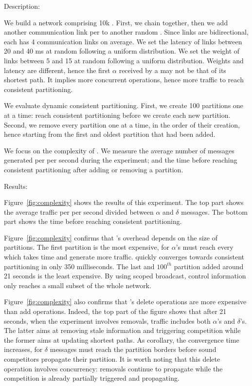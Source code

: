 \begin{asparadesc}
\item [Description:]

We build a network comprising 10k \processes. First, we chain
\processes together, then we add another communication link per
\process to another random \process. Since links are bidirectional,
each \process has 4 communication links on average. We set the latency
of links between 20 and 40 ms at random following a uniform
distribution. We set the weight of links between 5 and 15 at random
following a uniform distribution. Weights and latency are different,
hence the first $\alpha$ received by a \process may not be that of its
shortest path. It implies more concurrent operations, hence more
traffic to reach consistent partitioning.

\noindent We evaluate dynamic consistent partitioning. First, we
create 100 partitions one at a time: \processes reach consistent
partitioning before we create each new partition. Second, we remove
every partition one at a time, in the order of their creation, hence
starting from the first and oldest partition that had been added.

\noindent We focus on the complexity of \NAME. We measure the average
number of messages generated per \process per second during the
experiment; and the time before reaching consistent partitioning after
adding or removing a partition.

\item [Results:]

Figure~\ref{fig:complexity} shows the results of this experiment. The
top part shows the average traffic per \process per second divided
between $\alpha$ and $\delta$ messages. The bottom part shows the time
before reaching consistent partitioning.

\noindent Figure~\ref{fig:complexity} confirms that \NAME's overhead
depends on the size of partitions. The first partition is the most
expensive, for $\alpha$'s must reach every \process which takes time
and generate more traffic.  \NAME quickly converges towards consistent
partitioning in only 350 milliseconds. The last and $100^{th}$
partition added around 21 seconds is the least expensive. By using
scoped broadcast, control information only reaches a small subset of
the whole network.

\noindent Figure~\ref{fig:complexity} also confirms that \NAME's
delete operations are more expensive than add operations. Indeed, the
top part of the figure shows that after 21 seconds, when the
experiment involves removals, traffic includes both $\alpha$'s and
$\delta$'s. The latter aims at removing stale information and
triggering competition while the former aims at updating shortest
paths. As corollary, the convergence time increases, for $\delta$
messages must reach the partition borders before sound competitors
propagate their partition. It is worth noting that this delete
operation involves concurrency: removals continue to propagate while
the competition is already partially triggered and propagating.


\end{asparadesc}
